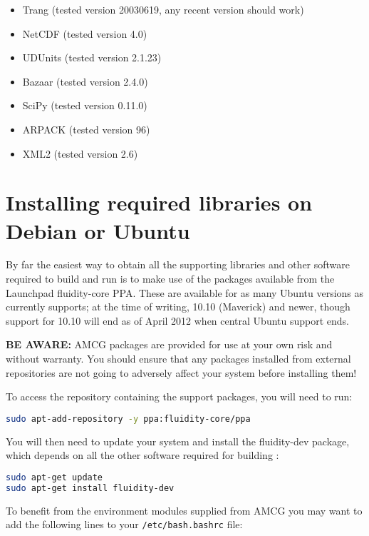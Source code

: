 \begin{itemize}
\item Trang (tested version 20030619, any recent version should work)
\item NetCDF (tested version 4.0)
\item UDUnits (tested version 2.1.23)
\item Bazaar (tested version 2.4.0)
\item SciPy (tested version 0.11.0)
\item ARPACK (tested version 96)
\item XML2 (tested version 2.6)
\end{itemize}

\section{Installing required libraries on Debian or Ubuntu}
\label{sec:required_ḻibraries_debian}

By far the easiest way to obtain all the supporting libraries and other
software required to build and run \fluidity is to make use of the \fluidity
packages available from the Launchpad fluidity-core PPA. These are available
for as many Ubuntu versions as \fluidity currently supports; at the time of
writing, 10.10 (Maverick) and newer, though support for 10.10 will end as of
April 2012 when central Ubuntu support ends.

\textbf{BE AWARE:} AMCG packages are provided for use at your own risk and
without warranty. You should ensure that any packages installed from external
repositories are not going to adversely affect your system before installing
them!

To access the repository containing the \fluidity support packages, you will
need to run:

\begin{lstlisting}[language=bash]
sudo apt-add-repository -y ppa:fluidity-core/ppa
\end{lstlisting}

You will then need to update your system and install the fluidity-dev package,
which depends on all the other software required for building \fluidity:

\begin{lstlisting}[language=bash]
sudo apt-get update
sudo apt-get install fluidity-dev
\end{lstlisting}

To benefit from the environment modules supplied from AMCG you may want to add
the following lines to your \lstinline[language=bash]+/etc/bash.bashrc+ file:

